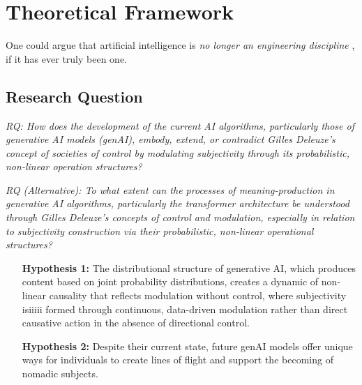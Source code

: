 \chapter{Theoretical Framework}\label{chap:Theoretical Framework} %
One could argue that artificial intelligence is \emph{no longer an engineering discipline} \parencite[206]{dignum2020}, if it has ever truly been one.

\section{Research Question}

\begin{center}

	\textit{RQ: How does the development of the current AI algorithms, particularly those of generative AI models (genAI), embody, extend, or contradict Gilles Deleuze’s concept of societies of control by modulating subjectivity through its probabilistic, non-linear operation structures?}

	\textit{RQ (Alternative): To what extent can the processes of meaning-production in generative AI algorithms, particularly the transformer architecture be understood through Gilles Deleuze’s concepts of control and modulation, especially in relation to subjectivity construction via their probabilistic, non-linear operational structures?}
\end{center}

\begin{itemize}
	\item [\textbf{Hypothesis 1:}] The distributional structure of generative AI, which produces content based on joint probability distributions, creates a dynamic of non-linear causality that reflects modulation without control, where subjectivity isiiiii formed through continuous, data-driven modulation rather than direct causative action in the absence of directional control. 
	\item [\textbf{Hypothesis 2:}] Despite their current state, future genAI models
	      offer unique ways for individuals to create lines of
	      flight and support the becoming of nomadic subjects. 
\end{itemize}

